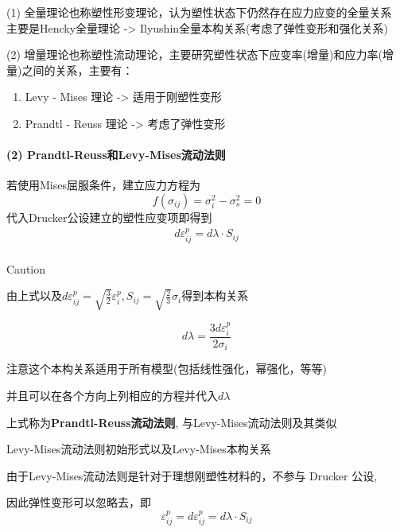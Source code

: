 \documentclass[UTF8]{ctexart}
\providecommand{\tightlist}{%
  \setlength{\itemsep}{0pt}\setlength{\parskip}{0pt}}
\begin{document}
(1) 全量理论也称塑性形变理论，认为塑性状态下仍然存在应力应变的全量关系\\
主要是Hencky全量理论 -\textgreater{}
Ilyushin全量本构关系(考虑了弹性变形和强化关系)

(2)
增量理论也称塑性流动理论，主要研究塑性状态下应变率(增量)和应力率(增量)之间的关系，主要有：

\begin{enumerate}
\tightlist
\item
  Levy - Mises 理论 -\textgreater{} 适用于刚塑性变形
\item
  Prandtl - Reuss 理论 -\textgreater{} 考虑了弹性变形
\end{enumerate}

\hypertarget{prandtl-reussux548clevy-misesux6d41ux52a8ux6cd5ux5219}{%
\paragraph{(2)
Prandtl-Reuss和Levy-Mises流动法则}\label{prandtl-reussux548clevy-misesux6d41ux52a8ux6cd5ux5219}}

若使用Mises屈服条件，建立应力方程为\\
{\[\boxed{f(\sigma_{ij}) = \sigma_{i}^{2} - \sigma_{s}^{2} = 0}\]}代入Drucker公设建立的塑性应变项即得到\\
{\[\begin{matrix}
\boxed{d\varepsilon_{ij}^{p} = d\lambda \cdot S_{ij}} \\
\end{matrix}\]}

Caution

由上式以及{\(d\varepsilon_{ij}^{p} = \sqrt{\frac{3}{2}}\varepsilon_{i}^{p},S_{ij} = \sqrt{\frac{2}{3}}\sigma_{i}\)}得到本构关系

{\[d\lambda = \frac{3d\varepsilon_{i}^{p}}{2\sigma_{i}}\]}

注意这个本构关系适用于所有模型(包括线性强化，幂强化，等等)

并且可以在各个方向上列相应的方程并代入{\(d\lambda\)}

上式称为\textbf{Prandtl-Reuss流动法则}, 与Levy-Mises流动法则及其类似

Levy-Mises流动法则初始形式以及Levy-Mises本构关系

由于Levy-Mises流动法则是针对于理想刚塑性材料的，不参与 Drucker 公设,

因此弹性变形可以忽略去，即\\
{\[\varepsilon_{ij}^{p} = d\varepsilon_{ij}^{p} = d\lambda \cdot S_{ij}\]}
\end{document}
